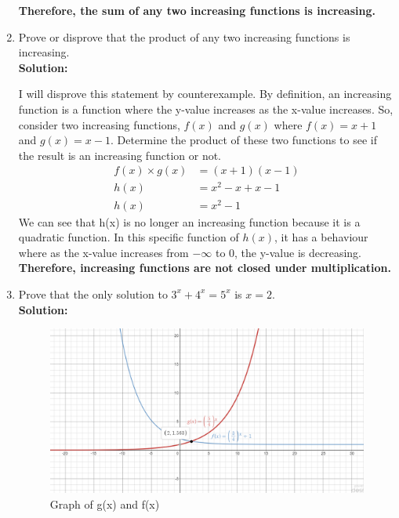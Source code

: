 \documentclass[12pt]{book}
\begin{document}
\begin{enumerate}
\textbf{Therefore, the sum of any two increasing functions is increasing.}

\newpage

\item Prove or disprove that the product of any two increasing functions is increasing.\\

\textbf{Solution: }

I will disprove this statement by counterexample. By definition, an increasing function is a function where the y-value increases as the x-value increases. So, consider two increasing functions, $f(x)$ and $g(x)$ where $f(x) = x + 1$ and $g(x) = x - 1$. Determine the product of these two functions to see if the result is an increasing function or not.
\begin{align*}
    f(x) \times g(x) &= (x+1)(x-1)\\
    h(x) &= x^2 - x + x -1\\
    h(x) &= x^2 - 1
\end{align*}
We can see that h(x) is no longer an increasing function because it is a quadratic function. In this specific function of $h(x)$, it has a behaviour where as the x-value increases from $-\infty$ to 0, the y-value is decreasing.\\

\textbf{Therefore, increasing functions are not closed under multiplication.}


\newpage

\item Prove that the only solution to $3^x + 4^x = 5^x$ is $x=2$.\\

\textbf{Solution:}

\begin{figure}[h]
\centering
\includegraphics[width=1\textwidth]{Q7Graph.png}
\caption{Graph of g(x) and f(x)}
\end{figure} 


\end{enumerate}
\end{document}
